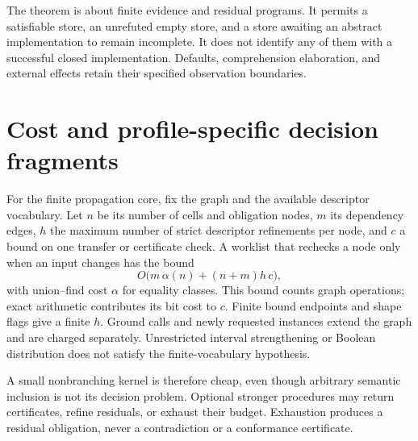 \documentclass[11pt,a4paper,oneside]{report}
\theoremstyle{remark}
\begin{document}
The theorem is about finite evidence and residual programs. It permits a
satisfiable store, an unrefuted empty store, and a store awaiting an abstract
implementation to remain incomplete. It does not identify any of them with a
successful closed implementation. Defaults, comprehension elaboration, and
external effects retain their specified observation boundaries.

\section{Cost and profile-specific decision fragments}
For the finite propagation core, fix the graph and the available descriptor
vocabulary. Let $n$ be its number of cells and obligation nodes, $m$ its dependency
edges, $h$ the maximum number of strict descriptor refinements per node, and $c$
a bound on one transfer or certificate check. A worklist that rechecks a node
only when an input changes has the bound
\[
 O\bigl(m\,\alpha(n)+(n+m)h\,c\bigr),
\]
with union--find cost $\alpha$ for equality classes. This bound counts graph
operations; exact arithmetic contributes its bit cost to $c$. Finite bound
endpoints and shape flags give a finite $h$. Ground calls and newly requested
instances extend the graph and are charged separately. Unrestricted interval
strengthening or Boolean distribution does not satisfy the finite-vocabulary
hypothesis.

A small nonbranching kernel is therefore cheap, even though arbitrary semantic
inclusion is not its decision problem. Optional stronger procedures may return
certificates, refine residuals, or exhaust their budget. Exhaustion produces a
residual obligation, never a contradiction or a conformance certificate.
\end{document}
